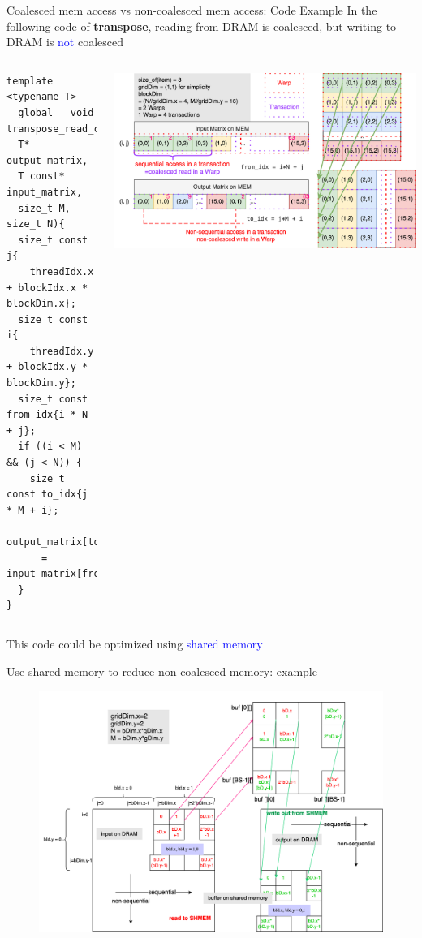 \documentclass[dvipdfmx, 11pt, aspectratio=169]{beamer}   %
\begin{document}
\begin{frame}[fragile]{Coalesced mem access vs non-coalesced mem access: Code Example}
  In the following code of \textbf{transpose}, reading from DRAM is coalesced, but writing to DRAM is \textcolor{blue}{not} coalesced
  \begin{columns}
\begin{lstlisting}[language=CUDA, basicstyle=\ttfamily\tiny]
template <typename T>
__global__ void transpose_read_coalesced(
  T* output_matrix, 
  T const* input_matrix,
  size_t M, size_t N){
  size_t const j{
    threadIdx.x + blockIdx.x * blockDim.x};
  size_t const i{
    threadIdx.y + blockIdx.y * blockDim.y};
  size_t const from_idx{i * N + j};
  if ((i < M) && (j < N)) {
    size_t const to_idx{j * M + i};
    output_matrix[to_idx] 
      = input_matrix[from_idx];
  }
}
\end{lstlisting}
    \includegraphics[scale=0.1]{img/transposeReadCoalesced.png}
  \end{columns}
  This code could be optimized using \textcolor{blue}{shared memory}
\end{frame}
\begin{frame}{Use shared memory to reduce non-coalesced memory: example}
  \begin{figure}
    \includegraphics[scale=0.08]{img/transposeFullCoalesced.png}
  \end{figure}
\end{frame}
  
\end{document}
